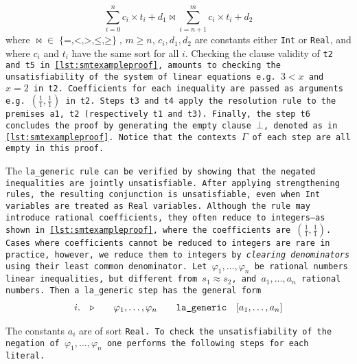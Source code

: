\begin{equation}
\sum_{i=0}^{n}c_i\times{}t_i + d_1\bowtie \sum_{i=n+1}^{m} c_i\times{}t_i + d_2
\label{eqn:inequality}
\end{equation}
%
where $\mathop{\bowtie} \mathrel{\in} \mathop{\{=, <, >, \leq, \geq\}}$, $m\geq n$, $c_i, d_1, d_2$ are constants either \lstinline[language=SMT,basicstyle=\ttfamily\footnotesize]{Int} or \lstinline[language=SMT,basicstyle=\ttfamily\footnotesize]{Real},
and where $c_i$ and $t_i$ have the same sort for all $i$.
Checking the clause validity of \tt{t2} and \tt{t5} in \cref{lst:smtexampleproof}, amounts to checking the unsatisfiability of the system of linear equations e.g. $3 < x$ and $x = 2$ in \tt{t2}.
Coefficients for each inequality are passed as arguments e.g. $(\frac{1}{1},\frac{1}{1})$ in \tt{t2}.
Steps \tt{t3} and \tt{t4} apply the \colorbox{purple!30}{\texttt{resolution}} rule to the premises \tt{a1}, \tt{t2} (respectively \tt{t1} and \tt{t3}).
Finally, the step \texttt{t6} concludes the proof by generating the empty clause $\bot$, denoted as  in \cref{lst:smtexampleproof}.
Notice that the contexts \colorbox{blue!30}{$\Gamma$} of each step are all empty in this proof.

The \tt{la\_generic} rule can be verified by showing that the negated inequalities are jointly unsatisfiable.
After applying strengthening rules, the resulting conjunction is unsatisfiable,
even when \lstinline[language=SMT,basicstyle=\ttfamily\footnotesize\upshape]{Int} variables are treated as \lstinline[language=SMT,basicstyle=\ttfamily\footnotesize\upshape]{Real} variables.
Although the rule may introduce rational coefficients, they often reduce to integers—as shown in \cref{lst:smtexampleproof}, where the coefficients are $(\frac{1}{1}, \frac{1}{1})$.
Cases where coefficients cannot be reduced to integers are rare in practice, however, we reduce them to integers by \emph{clearing denominators} using their least common denominator.
Let $\varphi_1,\dots, \varphi_n$ be rational numbers linear inequalities, but different from $s_1 \approx s_2$, and $a_1, \dots, a_n$ rational numbers. Then a \tt{la\_generic} step has the general form
%
\[
\begin{matrix*}[c]
  i. & \ctxsep \quad & \varphi_1 , \dots , \varphi_n & \quad \tt{la\_generic}  & [a_1, \dots, a_n] \\
\end{matrix*}
\]

The constants $a_i$ are of sort \tt{Real}. To check the unsatisfiability of the negation of $\varphi_1, \dots, \varphi_n$ one performs the following steps for each literal.

